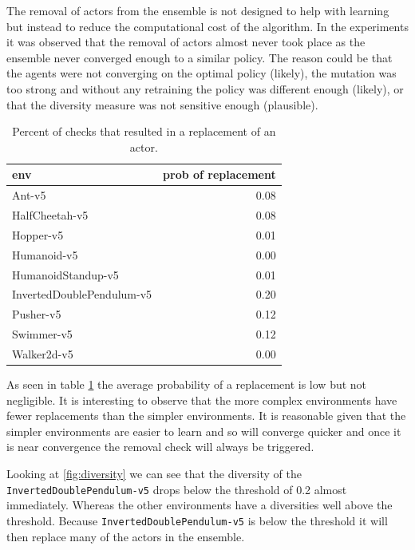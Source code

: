 The removal of actors from the ensemble is not designed to help with learning but instead to reduce the computational cost of the algorithm. In the experiments it was observed that the removal of actors almost never took place as the ensemble never converged enough to a similar policy. The reason could be that the agents were not converging on the optimal policy (likely), the mutation was too strong and without any retraining the policy was different enough (likely), or that the diversity measure was not sensitive enough (plausible). 

\begin{table}[H]
    \centering
    \begin{tabular}{lr}
        \toprule
        env & prob of replacement \\
        \midrule
        Ant-v5 & 0.08 \\
        HalfCheetah-v5 & 0.08 \\
        Hopper-v5 & 0.01 \\
        Humanoid-v5 & 0.00 \\
        HumanoidStandup-v5 & 0.01 \\
        InvertedDoublePendulum-v5 & 0.20 \\
        Pusher-v5 & 0.12 \\
        Swimmer-v5 & 0.12 \\
        Walker2d-v5 & 0.00 \\
        \bottomrule
    \end{tabular}
    \caption{Percent of checks that resulted in a replacement of an actor.}
    \label{tab:avg_replacement_per_check}
\end{table}

As seen in table \ref{tab:avg_replacement_per_check} the average probability of a replacement is low but not negligible. It is interesting to observe that the more complex environments have fewer replacements than the simpler environments. It is reasonable given that the simpler environments are easier to learn and so will converge quicker and once it is near convergence the removal check will always be triggered.

Looking at \ref{fig:diversity} we can see that the diversity of the \texttt{InvertedDoublePendulum-v5} drops below the threshold of 0.2 almost immediately. Whereas the other environments have a diversities well above the threshold. Because \texttt{InvertedDoublePendulum-v5} is below the threshold it will then replace many of the actors in the ensemble.

